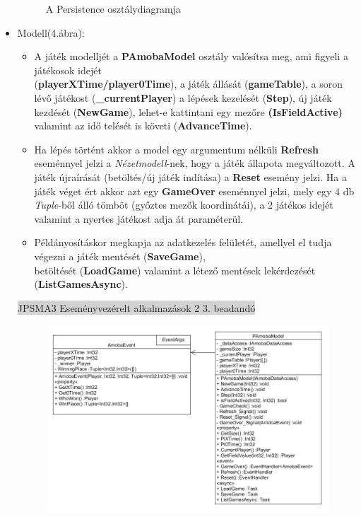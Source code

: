 \documentclass[11pt,a4paper]{article}
\begin{document}
\begin{itemize}
\begin{figure}[h]
		\caption{A Persistence osztálydiagramja}
	\end{figure}
	\item Modell(4.ábra):
	\begin{itemize}
		\item A játék modelljét a \textbf{PAmobaModel} osztály valósítsa meg, ami figyeli
		a játékosok idejét\\(\textbf{playerXTime/player0Time}), a játék állását
		(\textbf{gameTable}), a soron lévő játékost (\textbf{\_currentPlayer})
		a lépések kezelését (\textbf{Step}), új játék kezdését (\textbf{NewGame}),\br
		lehet-e kattintani egy mezőre \textbf{(IsFieldActive)}
		valamint az idő telését is követi (\textbf{AdvanceTime}).
		\item Ha lépés történt akkor a model egy argumentum nélküli \textbf{Refresh}
		eseménnyel jelzi a \textit{Nézetmodell}-nek, hogy a játék állapota megváltozott.
		A játék újraírását (betöltés/új játék indítása) a \textbf{Reset} esemény jelzi.
		Ha a játék véget ért akkor azt egy \textbf{GameOver} eseménnyel jelzi, mely egy
		4 db \textit{Tuple}-ből álló tömböt (győztes mezők koordinátái), a 2 játékos
		idejét valamint a nyertes játékost adja át paraméterül.
		\item Példányosításkor megkapja az adatkezelés felületét, amellyel el tudja végezni
		a játék mentését (\textbf{SaveGame}), \\betöltését (\textbf{LoadGame})
		valamint a létező mentések lekérdezését (\textbf{ListGamesAsync}).
	\end{itemize}
	\newpage
	\thispagestyle{empty}
	\begin{center}
		\colorbox{lightgray}{{\large JPSMA3} \hspace{3cm} {\large Eseményvezérelt alkalmazások 2 3. beadandó} \hspace{5cm} \thepage}
	\end{center}
	\begin{figure}[h]
		\centering
		\includegraphics[width=17cm]{UMLs/ModellClass.png}

\end{figure}
\end{itemize}
\end{document}
